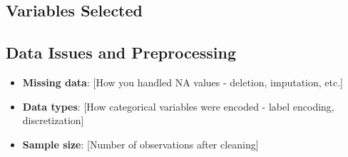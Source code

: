 \documentclass[main.tex]{subfiles}
\begin{document}
\subsection{Variables Selected}

\subsection{Data Issues and Preprocessing}
\begin{itemize}
  \item \textbf{Missing data}: [How you handled NA values - deletion, imputation, etc.]
  \item \textbf{Data types}: [How categorical variables were encoded - label encoding, discretization]
  \item \textbf{Sample size}: [Number of observations after cleaning]
\end{itemize}


\end{document}
